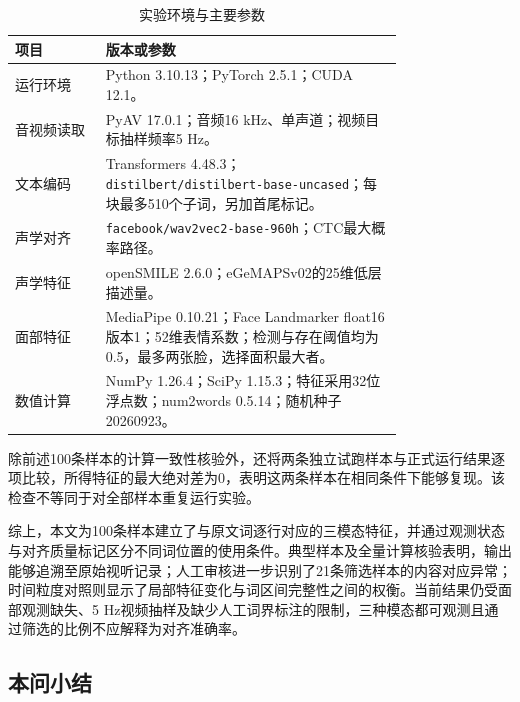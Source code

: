 \begin{table}[H]
    \centering\small
    \caption{实验环境与主要参数}
    \label{tab:p1_repro_settings}
    \renewcommand{\arraystretch}{1.15}
    \begin{tabular}{@{}>{\raggedright\arraybackslash}p{0.18\linewidth}>{\raggedright\arraybackslash}p{0.59\linewidth}@{}}
        \toprule
        项目 & 版本或参数\\ \midrule
        运行环境 & Python 3.10.13；PyTorch 2.5.1；CUDA 12.1。\\
        音视频读取 & PyAV 17.0.1；音频16 kHz、单声道；视频目标抽样频率5 Hz。\\
        文本编码 & Transformers 4.48.3；\nolinkurl{distilbert/distilbert-base-uncased}；每块最多510个子词，另加首尾标记。\\
        声学对齐 & \nolinkurl{facebook/wav2vec2-base-960h}；CTC最大概率路径。\\
        声学特征 & openSMILE 2.6.0；eGeMAPSv02的25维低层描述量。\\
        面部特征 & MediaPipe 0.10.21；Face Landmarker float16版本1；52维表情系数；检测与存在阈值均为0.5，最多两张脸，选择面积最大者。\\
        数值计算 & NumPy 1.26.4；SciPy 1.15.3；特征采用32位浮点数；num2words 0.5.14；随机种子20260923。\\
        \bottomrule
    \end{tabular}
\end{table}

除前述100条样本的计算一致性核验外，还将两条独立试跑样本与正式运行结果逐项比较，所得特征的最大绝对差为0，表明这两条样本在相同条件下能够复现。该检查不等同于对全部样本重复运行实验。

综上，本文为100条样本建立了与原文词逐行对应的三模态特征，并通过观测状态与对齐质量标记区分不同词位置的使用条件。典型样本及全量计算核验表明，输出能够追溯至原始视听记录；人工审核进一步识别了21条筛选样本的内容对应异常；时间粒度对照则显示了局部特征变化与词区间完整性之间的权衡。当前结果仍受面部观测缺失、5 Hz视频抽样及缺少人工词界标注的限制，三种模态都可观测且通过筛选的比例不应解释为对齐准确率。


















\subsection{本问小结}

